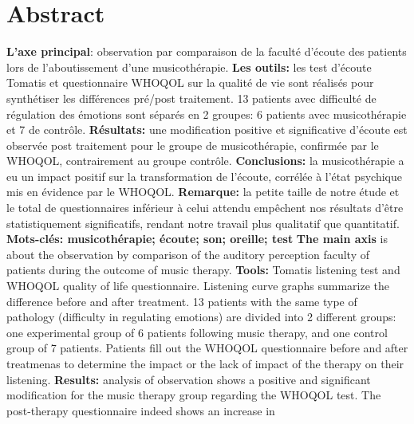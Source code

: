 \section*{Abstract}
\textbf{L'axe principal}: observation par comparaison de la faculté d'écoute des patients lors 
de l'aboutissement d'une musicothérapie.
\textbf{Les outils:} les test d'écoute Tomatis et questionnaire WHOQOL sur la qualité de vie sont réalisés 
pour synthétiser les différences  pré/post traitement.
 13 patients avec difficulté de régulation des émotions sont séparés en 2 
 groupes: 6 patients avec musicothérapie et  7 de contrôle.
\textbf{Résultats:} une modification positive et significative d'écoute est observée post traitement %
 pour le groupe de 
musicothérapie, confirmée par le  WHOQOL, contrairement au groupe contrôle. %
\textbf{Conclusions:} la musicothérapie a eu un impact positif sur la transformation de l'écoute, corrélée 
à l'état psychique mis en évidence par le WHOQOL.
\textbf{Remarque:} la petite taille de notre étude et le total de questionnaires
inférieur à celui attendu empêchent nos résultats d'être 
statistiquement significatifs, rendant notre travail plus qualitatif que quantitatif.
\textbf{Mots-clés: musicothérapie; écoute; son; oreille; test}
\textbf {The main axis} is about the observation by comparison of the auditory perception faculty of 
patients during the outcome of music therapy.
\textbf{Tools:} Tomatis listening test and WHOQOL quality of life questionnaire.
Listening curve graphs summarize the difference before and after treatment.
13 patients with the same type of pathology (difficulty in regulating
emotions) are divided into 2 different groups: one experimental group of 6 patients following music 
therapy, and one control group of 7 patients. Patients fill out the WHOQOL questionnaire before and after 
treatmenas to determine the impact or the lack of impact of the therapy on their listening.
\textbf{Results:} analysis of observation shows a positive and significant modification for the music 
therapy group regarding the WHOQOL test. The post-therapy questionnaire indeed shows an increase in 
